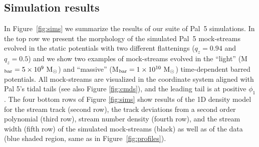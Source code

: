 \documentclass[twocolumn]{aastex62}
\newcommand{\msun}{\textrm{M}_\odot}
\begin{document}
\subsection{Simulation results}
\label{sec:sim_results}
In Figure~\ref{fig:sims} we summarize the results of our suite of Pal~5 simulations.
In the top row we present the morphology of the simulated Pal~5 mock-streams evolved in the static potentials with two different flattenings ($q_z = 0.94$ and $q_z = 0.5$) and we show two examples of mock-streams evolved in the ``light'' (M$_{\rm bar} = 5\times 10^9~\msun$) and ``massive'' (M$_{\rm bar} = 1\times 10^{10}~\msun$) time-dependent barred potentials.
All mock-streams are visualized in the coordinate system aligned with Pal 5's tidal tails (see also Figure \ref{fig:cmds}), and the leading tail is at positive $\phi_1$.
The four bottom rows of Figure \ref{fig:sims} show results of the 1D density model for the stream track (second row), the track deviations from a second order polynomial (third row), stream number density (fourth row), and the stream width (fifth row) of the simulated mock-streams (black) as well as of the data (blue shaded region, same as in Figure~\ref{fig:profiles}).
\end{document}
